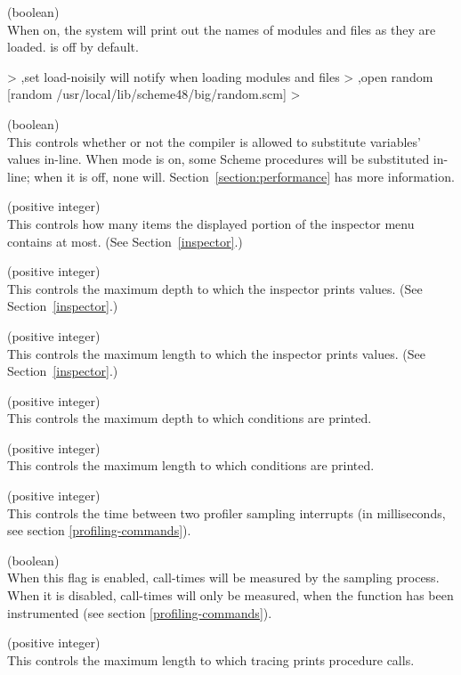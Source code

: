 \begin{description}
\item {} (boolean)\\
    When on, the system will print out the names of modules and files
    as they are loaded.   is off by default.
\begin{example}
> ,set load-noisily
will notify when loading modules and files
> ,open random
[random /usr/local/lib/scheme48/big/random.scm]
> 
\end{example}

\item {} (boolean)\\
This controls whether or not the compiler is allowed to substitute
 variables' values in-line.
When  mode is on,
some Scheme procedures will be substituted in-line; when it is off,
none will.
Section~\ref{section:performance}
has more information.

\item {} (positive integer)\\
This controls how many items the displayed portion of the inspector
menu contains at most.  (See Section~\ref{inspector}.)

\item {} (positive integer)\\
This controls the maximum depth to which the inspector
prints values.  (See Section~\ref{inspector}.)

\item {} (positive integer)\\
This controls the maximum length to which the inspector
prints values.  (See Section~\ref{inspector}.)

\item {} (positive integer)\\
This controls the maximum depth to which conditions
are printed.

\item {} (positive integer)\\
This controls the maximum length to which conditions
are printed.

\item {} (positive integer)\\
This controls the time between two profiler sampling interrupts
(in milliseconds, see section \ref{profiling-commands}).

\item {} (boolean)\\
When this flag is enabled, call-times will be measured by the sampling process.
When it is disabled, call-times will only be measured, when the function has been
instrumented (see section \ref{profiling-commands}).

\item {} (positive integer)\\
This controls the maximum length to which tracing
prints procedure calls.
\end{description}

